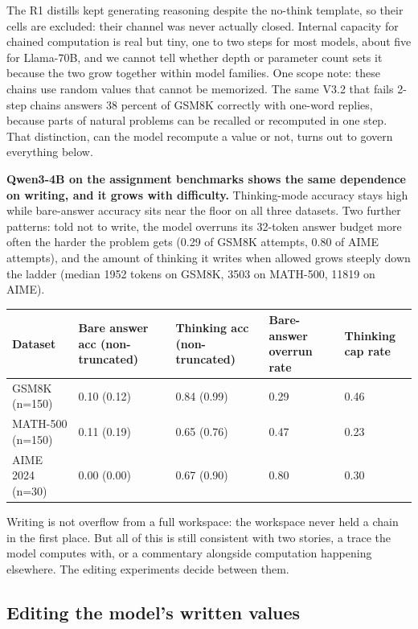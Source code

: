 The R1 distills kept generating reasoning despite the no-think template,
so their cells are excluded: their channel was never actually closed.
Internal capacity for chained computation is real but tiny, one to two
steps for most models, about five for Llama-70B, and we cannot tell
whether depth or parameter count sets it because the two grow together
within model families. One scope note: these chains use random values
that cannot be memorized. The same V3.2 that fails 2-step chains answers
38 percent of GSM8K correctly with one-word replies, because parts of
natural problems can be recalled or recomputed in one step. That
distinction, can the model recompute a value or not, turns out to govern
everything below.

\textbf{Qwen3-4B on the assignment benchmarks shows the same dependence
on writing, and it grows with difficulty.} Thinking-mode accuracy stays
high while bare-answer accuracy sits near the floor on all three
datasets. Two further patterns: told not to write, the model overruns
its 32-token answer budget more often the harder the problem gets (0.29
of GSM8K attempts, 0.80 of AIME attempts), and the amount of thinking it
writes when allowed grows steeply down the ladder (median 1952 tokens on
GSM8K, 3503 on MATH-500, 11819 on AIME).

\begin{table}[t]\centering\small
\begin{tabular}{lllll}
\toprule
Dataset & Bare answer acc (non-truncated) & Thinking acc (non-truncated) & Bare-answer overrun rate & Thinking cap rate \\
\midrule



GSM8K (n=150) & 0.10 (0.12) & 0.84 (0.99) & 0.29 & 0.46 \\
MATH-500 (n=150) & 0.11 (0.19) & 0.65 (0.76) & 0.47 & 0.23 \\
AIME 2024 (n=30) & 0.00 (0.00) & 0.67 (0.90) & 0.80 & 0.30 \\
\bottomrule
\end{tabular}
\end{table}

Writing is not overflow from a full workspace: the workspace never held
a chain in the first place. But all of this is still consistent with two
stories, a trace the model computes with, or a commentary alongside
computation happening elsewhere. The editing experiments decide between
them.

\subsection{Editing the model's written
values}\label{editing-the-models-written-values}

